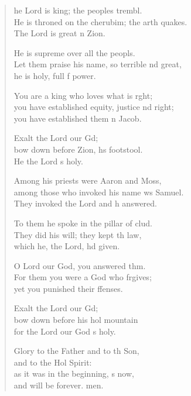 \settowidth{\versewidth}{He is throned on the cherubim; the earth quakes. *}
\begin{verse}%
  \begin{patverse}
he Lord is king; the peoples trembl.\Flex\\
He is throned on the cherubim; the arth quakes.\Med\\
The Lord is great \pointup{\i}n Zion.

He is supreme over all the peopls.\Flex\\
Let them praise his name, so terrible nd great,\Med\\
he is holy, full f power.

You are a king who loves what is r\pointup{\i}ght;\Flex\\
you have established equity, justice nd right;\Med\\
you have established them \pointup{\i}n Jacob.

Exalt the Lord our Gd;\Flex\\
bow down before Zion, h\pointup{\i}s footstool.\Med\\
He the Lord \pointup{\i}s holy.

Among his priests were Aaron and Moss,\Flex\\
among those who invoked his name ws Samuel.\Med\\
They invoked the Lord and h answered.

To them he spoke in the pillar of clud.\Flex\\
They did his will; they kept th law,\Med\\
which he, the Lord, hd given.

O Lord our God, you answered thm.\Flex\\
For them you were a God who frgives;\Med\\
yet you punished their ffenses.

Exalt the Lord our Gd;\Flex\\
bow down before his hol mountain\Med\\
for the Lord our God \pointup{\i}s holy.

Glory to the Father and to th Son,\Med\\
and to the Hol Spirit:\\
as it was in the beginning, \pointup{\i}s now,\Med\\
and will be forever. men.
  \end{patverse}
\end{verse}
